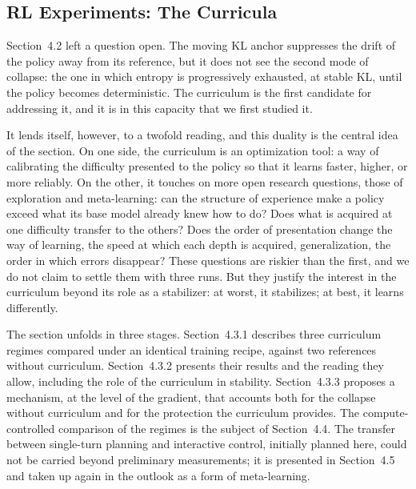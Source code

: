 \documentclass[11pt,a4paper]{article}
\begin{document}
\vspace{2cm}


\subsection{RL Experiments: The Curricula}
\label{sec:curriculums}

Section~4.2 left a question open. The moving KL anchor suppresses the drift of the policy away from its reference, but it does not see the second mode of collapse: the one in which entropy is progressively exhausted, at stable KL, until the policy becomes deterministic. The curriculum is the first candidate for addressing it, and it is in this capacity that we first studied it.

It lends itself, however, to a twofold reading, and this duality is the central idea of the section. On one side, the curriculum is an optimization tool: a way of calibrating the difficulty presented to the policy so that it learns faster, higher, or more reliably. On the other, it touches on more open research questions, those of exploration and meta-learning: can the structure of experience make a policy exceed what its base model already knew how to do? Does what is acquired at one difficulty transfer to the others? Does the order of presentation change the way of learning, the speed at which each depth is acquired, generalization, the order in which errors disappear? These questions are riskier than the first, and we do not claim to settle them with three runs. But they justify the interest in the curriculum beyond its role as a stabilizer: at worst, it stabilizes; at best, it learns differently.

The section unfolds in three stages. Section~4.3.1 describes three curriculum regimes compared under an identical training recipe, against two references without curriculum. Section~4.3.2 presents their results and the reading they allow, including the role of the curriculum in stability. Section~4.3.3 proposes a mechanism, at the level of the gradient, that accounts both for the collapse without curriculum and for the protection the curriculum provides. The compute-controlled comparison of the regimes is the subject of Section~4.4. The transfer between single-turn planning and interactive control, initially planned here, could not be carried beyond preliminary measurements; it is presented in Section~4.5 and taken up again in the outlook as a form of meta-learning.
\end{document}
